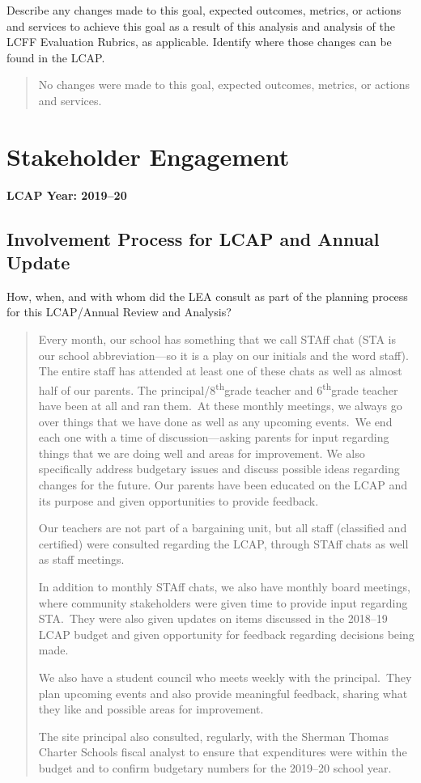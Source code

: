 \documentclass{article}
\newcommand{\supth}{\textsuperscript{th}}
\newcounter{goal}[section] %
\newcounter{action}[goal]
\begin{document}
Describe any changes made to this goal, expected outcomes, metrics, or actions and services to achieve this goal as a result of this analysis and analysis of the LCFF Evaluation Rubrics, as applicable. Identify where those changes can be found in the LCAP.
\begin{quotation}
	No changes were made to this goal, expected outcomes, metrics, or actions and services.
\end{quotation}

\section{Stakeholder Engagement}
{\bf LCAP Year: 2019--20}

\subsection{Involvement Process for LCAP and Annual Update}
How, when, and with whom did the LEA consult as part of the planning process for this LCAP/Annual Review and Analysis?
\begin{quotation}
	Every month, our school has something that we call STAff chat (STA is our school abbreviation---so it is a play on our initials and the word staff).  The entire staff has attended at least one of these chats as well as almost half of our parents. The principal/8\supth grade teacher and 6\supth grade teacher have been at all and ran them. At these monthly meetings, we always go over things that we have done as well as any upcoming events. We end each one with a time of discussion---asking parents for input regarding things that we are doing well and areas for improvement. We also specifically address budgetary issues and discuss possible ideas regarding changes for the future. Our parents have been educated on the LCAP and its purpose and given opportunities to provide feedback.

	Our teachers are not part of a bargaining unit, but all staff (classified and certified) were consulted regarding the LCAP, through STAff chats as well as staff meetings.

	In addition to monthly STAff chats, we also have monthly board meetings, where community stakeholders were given time to provide input regarding STA. They were also given updates on items discussed in the 2018--19 LCAP budget and given opportunity for feedback regarding decisions being made.

	We also have a student council who meets weekly with the principal. They plan upcoming events and also provide meaningful feedback, sharing what they like and possible areas for improvement.

	The site principal also consulted, regularly, with the Sherman Thomas Charter Schools fiscal analyst to ensure that expenditures were within the budget and to confirm budgetary numbers for the 2019--20 school year.
\end{quotation}
\end{document}

